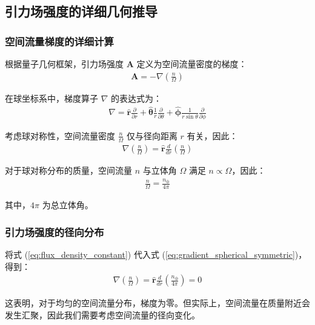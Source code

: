 \documentclass[12pt,twocolumn]{article}
\begin{document}
\subsection{引力场强度的详细几何推导}

\subsubsection{空间流量梯度的详细计算}

根据量子几何框架，引力场强度 $\mathbf{A}$ 定义为空间流量密度的梯度：
\begin{align}
    \mathbf{A} = -\nabla\left(\frac{n}{\Omega}\right)
    \label{eq:gravitational_field_def}
\end{align}

在球坐标系中，梯度算子 $\nabla$ 的表达式为：
\begin{align}
    \nabla = \hat{\mathbf{r}} \frac{\partial}{\partial r} + \hat{\boldsymbol{\theta}} \frac{1}{r} \frac{\partial}{\partial \theta} + \hat{\boldsymbol{\phi}} \frac{1}{r \sin\theta} \frac{\partial}{\partial \phi}
    \label{eq:gradient_spherical}
\end{align}

考虑球对称性，空间流量密度 $\frac{n}{\Omega}$ 仅与径向距离 $r$ 有关，因此：
\begin{align}
    \nabla\left(\frac{n}{\Omega}\right) = \hat{\mathbf{r}} \frac{d}{dr}\left(\frac{n}{\Omega}\right)
    \label{eq:gradient_spherical_symmetric}
\end{align}

对于球对称分布的质量，空间流量 $n$ 与立体角 $\Omega$ 满足 $n \propto \Omega$，因此：
\begin{align}
    \frac{n}{\Omega} = \frac{n_\oplus}{4\pi}
    \label{eq:flux_density_constant}
\end{align}

其中，$4\pi$ 为总立体角。

\subsubsection{引力场强度的径向分布}

将式 (\ref{eq:flux_density_constant}) 代入式 (\ref{eq:gradient_spherical_symmetric})，得到：
\begin{align}
    \nabla\left(\frac{n}{\Omega}\right) = \hat{\mathbf{r}} \frac{d}{dr}\left(\frac{n_\oplus}{4\pi}\right) = 0
    \label{eq:gradient_zero}
\end{align}

这表明，对于均匀的空间流量分布，梯度为零。但实际上，空间流量在质量附近会发生汇聚，因此我们需要考虑空间流量的径向变化。
\end{document}
